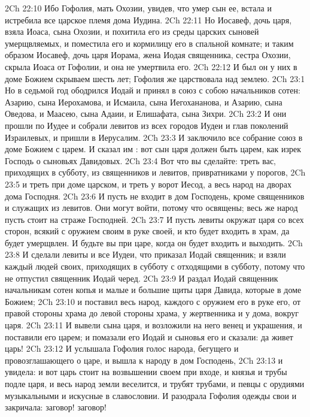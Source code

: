 \vs 2Ch 22:10 Ибо Гофолия, мать Охозии, увидев, что умер сын ее, встала и истребила все царское племя дома Иудина.
\vs 2Ch 22:11 Но Иосавеф, дочь царя, взяла Иоаса, сына Охозии, и похитила его из среды царских сыновей умерщвляемых, и поместила его и кормилицу его в спальной комнате; и таким образом Иосавеф, дочь царя Иорама, жена Иодая священника, сестра Охозии, скрыла Иоаса от Гофолии, и она не умертвила его.
\vs 2Ch 22:12 И был он у них в доме Божием скрываем шесть лет; Гофолия же царствовала над землею.
\vs 2Ch 23:1 Но в седьмой год ободрился Иодай и принял в союз с собою начальников сотен: Азарию, сына Иерохамова, и Исмаила, сына Иегохананова, и Азарию, сына Оведова, и Маасею, сына Адаии, и Елишафата, сына Зихри.
\vs 2Ch 23:2 И они прошли по Иудее и собрали левитов из всех городов Иудеи и глав поколений Израилевых, и пришли в Иерусалим.
\vs 2Ch 23:3 И заключило все собрание союз в доме Божием с царем. И сказал им : вот сын царя должен быть царем, как изрек Господь о сыновьях Давидовых.
\vs 2Ch 23:4 Вот что вы сделайте: треть вас, приходящих в субботу, из священников и левитов,  привратниками у порогов,
\vs 2Ch 23:5 и треть при доме царском, и треть у ворот Иесод, а весь народ на дворах дома Господня.
\vs 2Ch 23:6 И  пусть не входит в дом Господень, кроме священников и служащих из левитов. Они могут войти, потому что освящены; весь же народ пусть стоит на страже Господней.
\vs 2Ch 23:7 И пусть левиты окружат царя со всех сторон, всякий с оружием своим в руке своей, и кто будет входить в храм, да будет умерщвлен. И будьте вы при царе, когда он будет входить и выходить.
\vs 2Ch 23:8 И сделали левиты и все Иудеи, что приказал Иодай священник; и взяли каждый людей своих, приходящих в субботу с отходящими в субботу, потому что не отпустил священник Иодай  черед.
\vs 2Ch 23:9 И раздал Иодай священник начальникам сотен копья и малые и большие щиты царя Давида, которые  в доме Божием;
\vs 2Ch 23:10 и поставил весь народ, каждого с оружием его в руке его, от правой стороны храма до левой стороны храма, у жертвенника и у дома, вокруг царя.
\vs 2Ch 23:11 И вывели сына царя, и возложили на него венец и украшения, и поставили его царем; и помазали его Иодай и сыновья его и сказали: да живет царь!
\vs 2Ch 23:12 И услышала Гофолия голос народа, бегущего и провозглашающего о царе, и вышла к народу в дом Господень,
\vs 2Ch 23:13 и увидела: и вот царь стоит на возвышении своем при входе, и князья и трубы подле царя, и весь народ земли веселится, и трубят трубами, и певцы с орудиями музыкальными и искусные в славословии. И разодрала Гофолия одежды свои и закричала: заговор! заговор!
